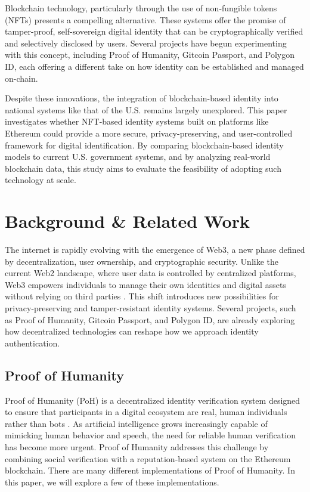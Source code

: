 \documentclass[conference]{IEEEtran}
\begin{document}
Blockchain technology, particularly through the use of non-fungible tokens (NFTs) presents a compelling alternative. These systems offer the promise of tamper-proof, self-sovereign digital identity that can be cryptographically verified and selectively disclosed by users. Several projects have begun experimenting with this concept, including Proof of Humanity, Gitcoin Passport, and Polygon ID, each offering a different take on how identity can be established and managed on-chain.

Despite these innovations, the integration of blockchain-based identity into national systems like that of the U.S. remains largely unexplored. This paper investigates whether NFT-based identity systems built on platforms like Ethereum could provide a more secure, privacy-preserving, and user-controlled framework for digital identification. By comparing blockchain-based identity models to current U.S. government systems, and by analyzing real-world blockchain data, this study aims to evaluate the feasibility of adopting such technology at scale.


\section{Background \& Related Work}
The internet is rapidly evolving with the emergence of Web3, a new phase defined by decentralization, user ownership, and cryptographic security. Unlike the current Web2 landscape, where user data is controlled by centralized platforms, Web3 empowers individuals to manage their own identities and digital assets without relying on third parties \cite{what-is-web3}. This shift introduces new possibilities for privacy-preserving and tamper-resistant identity systems. Several projects, such as Proof of Humanity, Gitcoin Passport, and Polygon ID, are already exploring how decentralized technologies can reshape how we approach identity authentication.

\subsection{Proof of Humanity}
Proof of Humanity (PoH) is a decentralized identity verification system designed to ensure that participants in a digital ecosystem are real, human individuals rather than bots \cite{what-is-poh}. As artificial intelligence grows increasingly capable of mimicking human behavior and speech, the need for reliable human verification has become more urgent. Proof of Humanity addresses this challenge by combining social verification with a reputation-based system on the Ethereum blockchain. There are many different implementations of Proof of Humanity. In this paper, we will explore a few of these implementations. 
\end{document}
